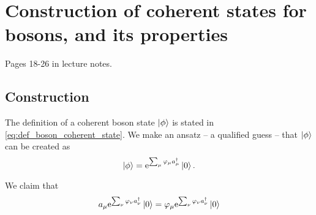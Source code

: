 \section{Construction of coherent states for bosons, and its properties}\label{unc:order_boson}

Pages 18-26 in lecture notes.

\subsection{Construction}
The definition of a coherent boson state $\ket{\phi}$ is stated in \eqref{eq:def_boson_coherent_state}. We make an ansatz -- a qualified guess -- that $\ket{\phi}$ can be created as
\begin{equation}
\label{eq:construction_coherent_boson}
\ket{\phi} = \mathrm{e}^{\sum_\mu\varphi_\mu a_\mu^\dagger}\ket{0}.
\end{equation}

We claim that 
\begin{equation}
\label{unc:indices}
a_\mu\mathrm{e}^{\sum_\nu\varphi_\nu a_\nu^\dagger}\ket{0} = \varphi_\mu\mathrm{e}^{\sum_\nu\varphi_\nu a_\nu^\dagger}\ket{0}
\end{equation} %

